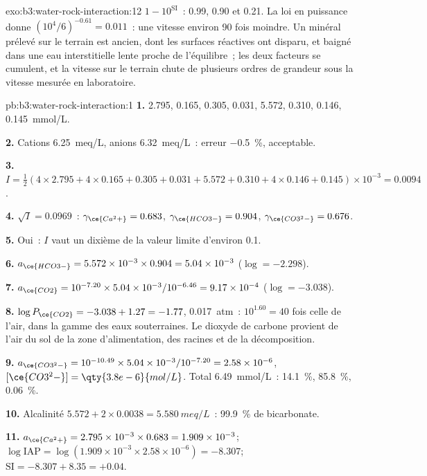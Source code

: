 \begin{solution}{exo:b3:water-rock-interaction:12}
$1 - 10^{\mathrm{SI}}$~: 0.99, 0.90 et 0.21. La loi en puissance donne
$(10^4/6)^{-0.61} = 0.011$~: une vitesse environ 90 fois moindre. Un minéral prélevé sur le terrain est
ancien, dont les surfaces réactives ont disparu, et baigné dans une eau interstitielle lente proche de
l'équilibre~; les deux facteurs se cumulent, et la vitesse sur le terrain chute de plusieurs ordres de
grandeur sous la vitesse mesurée en laboratoire.
\end{solution}

\begin{solution}{pb:b3:water-rock-interaction:1}
\textbf{1.}  2.795,  0.165,  0.305,  0.031,
 5.572,  0.310,  0.146,  \qty{0.145}{mmol/L}.

\textbf{2.} Cations \qty{6.25}{meq/L}, anions \qty{6.32}{meq/L}~: erreur
\qty{-0.5}{\percent}, acceptable.

\textbf{3.} $I = \tfrac12(4\times2.795 + 4\times0.165 + 0.305 + 0.031 + 5.572
+ 0.310 + 4\times0.146 + 0.145)\times10^{-3} = 0.0094$.

\textbf{4.} $\sqrt I = 0.0969$~: $\gamma_{\ce{Ca^2+}} = 0.683$,
$\gamma_{\ce{HCO3-}} = 0.904$, $\gamma_{\ce{CO3^2-}} = 0.676$.

\textbf{5.} Oui~: $I$ vaut un dixième de la valeur limite d'environ 0.1.

\textbf{6.} $a_{\ce{HCO3-}} = 5.572\times10^{-3}\times0.904 = 5.04\times
10^{-3}$ ($\log = -2.298$).

\textbf{7.} $a_{\ce{CO2}} = 10^{-7.20}\times5.04\times10^{-3}/10^{-6.46} =
9.17\times10^{-4}$ ($\log = -3.038$).

\textbf{8.} $\log P_{\ce{CO2}} = -3.038 + 1.27 = -1.77$, \qty{0.017}{atm}~:
$10^{1.60} = 40$ fois celle de l'air, dans la gamme des eaux souterraines. Le
dioxyde de carbone provient de l'air du sol de la zone d'alimentation, des racines et de la décomposition.

\textbf{9.} $a_{\ce{CO3^2-}} = 10^{-10.49}\times5.04\times10^{-3}/10^{-7.20}
= 2.58\times10^{-6}$, $[\ce{CO3^2-}] = \qty{3.8e-6}{mol/L}$. Total
\qty{6.49}{mmol/L}~:  \qty{14.1}{\percent}, 
\qty{85.8}{\percent},  \qty{0.06}{\percent}.

\textbf{10.} Alcalinité $5.572 + 2\times0.0038 = \qty{5.580}{meq/L}$~:
\qty{99.9}{\percent} de bicarbonate.

\textbf{11.} $a_{\ce{Ca^2+}} = 2.795\times10^{-3}\times0.683 = 1.909\times
10^{-3}$; $\log\mathrm{IAP} = \log(1.909\times10^{-3}\times2.58\times10^{-6})
= -8.307$; $\mathrm{SI} = -8.307 + 8.35 = +0.04$.


\end{solution}
